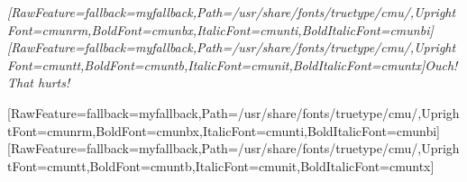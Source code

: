 \begin{myitemize}\item{}{\itshape \allowbreak{}\setmainfont{cmunti.ttf}[RawFeature={fallback=myfallback},Path=/usr/share/fonts/truetype/cmu/,UprightFont=cmunrm,BoldFont=cmunbx,ItalicFont=cmunti,BoldItalicFont=cmunbi]\setmonofont{cmunti.ttf}[RawFeature={fallback=myfallback},Path=/usr/share/fonts/truetype/cmu/,UprightFont=cmuntt,BoldFont=cmuntb,ItalicFont=cmunit,BoldItalicFont=cmuntx]\itshape {}Ouch! That hurts!}
\end{myitemize}
\allowbreak{}\setmainfont{cmunrm.ttf}[RawFeature={fallback=myfallback},Path=/usr/share/fonts/truetype/cmu/,UprightFont=cmunrm,BoldFont=cmunbx,ItalicFont=cmunti,BoldItalicFont=cmunbi]\setmonofont{cmunrm.ttf}[RawFeature={fallback=myfallback},Path=/usr/share/fonts/truetype/cmu/,UprightFont=cmuntt,BoldFont=cmuntb,ItalicFont=cmunit,BoldItalicFont=cmuntx]
